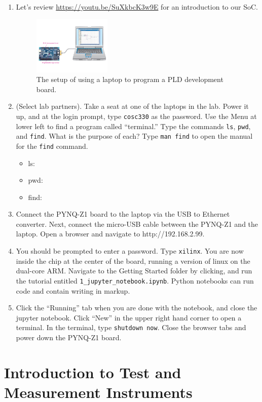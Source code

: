\documentclass{article}
\begin{document}
\begin{enumerate}
\item Let's review \url{https://youtu.be/SuXkbcK3w9E} for an introduction to our SoC.
\begin{figure}
\centering
\includegraphics[width=0.35\textwidth]{PYNQandLaptop.pdf}
\caption{\label{fig:pynq} The setup of using a laptop to program a PLD development board.}
\end{figure}
\item (Select lab partners).  Take a seat at one of the laptops in the lab.  Power it up, and at the login prompt, type \verb+cosc330+ as the password.  Use the Menu at lower left to find a program called ``terminal.''  Type the commands \verb+ls+, \verb+pwd+, and \verb+find+.  What is the purpose of each?  Type \verb+man find+ to open the manual for the \verb+find+ command.  
\begin{itemize}
\item ls:
\item pwd:
\item find:
\end{itemize}
\item Connect the PYNQ-Z1 board to the laptop via the USB to Ethernet converter.  Next, connect the micro-USB cable between the PYNQ-Z1 and the laptop.  Open a browser and navigate to http://192.168.2.99.
\item You should be prompted to enter a password.  Type \verb+xilinx+.  You are now inside the chip at the center of the board, running a version of linux on the dual-core ARM.  Navigate to the Getting Started folder by clicking, and run the tutorial entitled \verb+1_jupyter_notebook.ipynb+.  Python notebooks can run code and contain writing in markup.
\item Click the ``Running'' tab when you are done with the notebook, and close the jupyter notebook.  Click ``New'' in the upper right hand corner to open a terminal.  In the terminal, type \verb+shutdown now+.  Close the browser tabs and power down the PYNQ-Z1 board.
\end{enumerate}

\section{Introduction to Test and Measurement Instruments}
\end{document}
